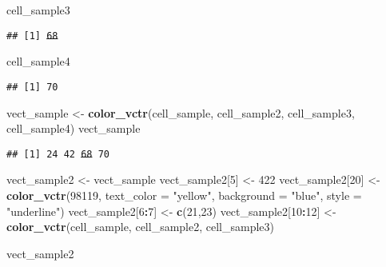 \documentclass[
]{article}
\newenvironment{Shaded}{\begin{snugshade}}{\end{snugshade}}
\newcommand{\DataTypeTok}[1]{\textcolor[rgb]{0.13,0.29,0.53}{#1}}
\newcommand{\DecValTok}[1]{\textcolor[rgb]{0.00,0.00,0.81}{#1}}
\newcommand{\KeywordTok}[1]{\textcolor[rgb]{0.13,0.29,0.53}{\textbf{#1}}}
\newcommand{\NormalTok}[1]{#1}
\newcommand{\OperatorTok}[1]{\textcolor[rgb]{0.81,0.36,0.00}{\textbf{#1}}}
\newcommand{\StringTok}[1]{\textcolor[rgb]{0.31,0.60,0.02}{#1}}
\begin{document}
\begin{Shaded}
\begin{Highlighting}[]
\NormalTok{cell_sample3}
\end{Highlighting}
\end{Shaded}

\texttt{\#\#\ [1]\ \sout{\textcolor[rgb]{1.0,0.0,1.0}{68}}}\newline

\begin{Shaded}
\begin{Highlighting}[]
\NormalTok{cell_sample4}
\end{Highlighting}
\end{Shaded}

\texttt{\#\#\ [1]\ \textcolor[rgb]{0.0,1.0,0.0}{70}}\newline

\begin{Shaded}
\begin{Highlighting}[]
\NormalTok{vect_sample <-}\StringTok{ }\KeywordTok{color_vctr}\NormalTok{(cell_sample, cell_sample2, cell_sample3, cell_sample4)}
\NormalTok{vect_sample}
\end{Highlighting}
\end{Shaded}

\texttt{\#\#\ [1]\ \colorbox[rgb]{0.0,0.0,1.0}{\textcolor[rgb]{1.0,0.0,0.0}{24}}\ \colorbox[rgb]{1.0,1.0,0.0}{42}\ \sout{\textcolor[rgb]{1.0,0.0,1.0}{68}}\ \textcolor[rgb]{0.0,1.0,0.0}{70}}\newline

\begin{Shaded}
\begin{Highlighting}[]
\NormalTok{vect_sample2 <-}\StringTok{ }\NormalTok{vect_sample}
\NormalTok{vect_sample2[}\DecValTok{5}\NormalTok{] <-}\StringTok{ }\DecValTok{422}
\NormalTok{vect_sample2[}\DecValTok{20}\NormalTok{] <-}\StringTok{ }\KeywordTok{color_vctr}\NormalTok{(}\DecValTok{98119}\NormalTok{, }\DataTypeTok{text_color =} \StringTok{"yellow"}\NormalTok{, }\DataTypeTok{background =} \StringTok{"blue"}\NormalTok{, }\DataTypeTok{style =} \StringTok{"underline"}\NormalTok{)}
\NormalTok{vect_sample2[}\DecValTok{6}\OperatorTok{:}\DecValTok{7}\NormalTok{] <-}\StringTok{ }\KeywordTok{c}\NormalTok{(}\DecValTok{21}\NormalTok{,}\DecValTok{23}\NormalTok{)}
\NormalTok{vect_sample2[}\DecValTok{10}\OperatorTok{:}\DecValTok{12}\NormalTok{] <-}\StringTok{ }\KeywordTok{color_vctr}\NormalTok{(cell_sample, cell_sample2, cell_sample3)}

\NormalTok{vect_sample2}
\end{Highlighting}
\end{Shaded}
\end{document}

